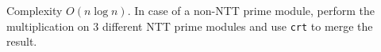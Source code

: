 Complexity $O(n\log n)$. In case of a non-NTT prime module, perform the multiplication on 3 different NTT prime modules and use \texttt{crt} to merge the result.

